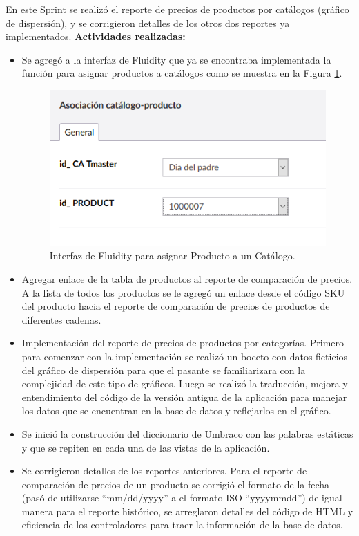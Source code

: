 En este Sprint se realizó el reporte de precios de productos por catálogos (gráfico de dispersión), y se corrigieron detalles de los otros dos reportes ya implementados.
\vskip 0.5cm
\textbf{Actividades realizadas:}
\begin{itemize}
  \item Se agregó a la interfaz de Fluidity que ya se encontraba implementada la función para asignar productos a catálogos como se muestra en la Figura \ref{fig:prod_cat}.
  \begin{figure}[H]
    \begin{center}
    \includegraphics[scale=0.7]{asignar_producto.png}
    \caption{Interfaz de Fluidity para asignar Producto a un Catálogo.}
    \label{fig:prod_cat}
    \end{center}
    \end{figure}
  
  \item Agregar enlace de la tabla de productos al reporte de comparación de precios. A la lista de todos los productos se le agregó un enlace desde el código SKU del producto hacia el reporte de comparación de precios de productos de diferentes cadenas.
  \item Implementación del reporte de precios de productos por categorías. Primero para comenzar con la implementación se realizó un boceto con datos ficticios del gráfico de dispersión para que el pasante se familiarizara con la complejidad de este tipo de gráficos. Luego se realizó la traducción, mejora y entendimiento del código de la versión antigua de la aplicación para manejar los datos que se encuentran en la base de datos y reflejarlos en el gráfico.
  \item Se inició la construcción del diccionario de Umbraco con las palabras estáticas y que se repiten en cada una de las vistas de la aplicación.
  \item Se corrigieron detalles de los reportes anteriores. Para el reporte de comparación de precios de un producto se corrigió el formato de la fecha (pasó  de utilizarse “mm/dd/yyyy” a el formato ISO “yyyymmdd”) de igual manera para el reporte histórico, se arreglaron detalles del código de HTML y eficiencia de los controladores para traer la información de la base de datos.
\end{itemize}

